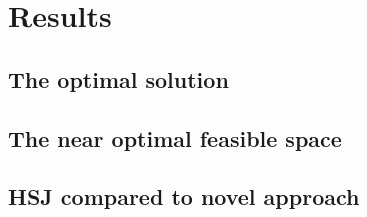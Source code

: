 
\chapter{Results}

\section{The optimal solution}


\section{The near optimal feasible space}


\section{HSJ compared to novel approach}
